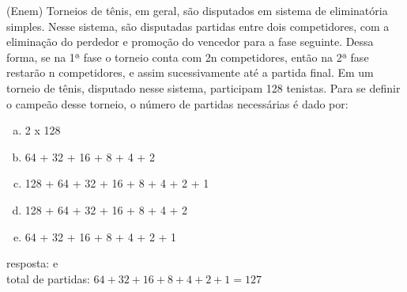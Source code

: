 \begin{ex} 
  (Enem) Torneios de tênis, em geral, são disputados em sistema de eliminatória simples. Nesse sistema, são disputadas partidas entre dois competidores, com a eliminação do perdedor e promoção do vencedor para a fase seguinte. Dessa forma, se na 1ª fase o torneio conta com 2n competidores, então na 2ª fase restarão n competidores, e assim sucessivamente até a partida final. Em um torneio de tênis, disputado nesse sistema, participam 128 tenistas. Para se definir o campeão desse torneio, o número de partidas necessárias é dado por:
    \begin{enumerate} [(a)]
        \item 2 x 128
        \item 64 + 32 + 16 + 8 + 4 + 2
        \item 128 + 64 + 32 + 16 + 8 + 4 + 2 + 1
        \item 128 + 64 + 32 + 16 + 8 + 4 + 2
        \item 64 + 32 + 16 + 8 + 4 + 2 + 1
    \end{enumerate}
      \begin{sol}
      resposta: e \\
      total de partidas: $64+32+16+8+4+2+1=127$
      \end{sol}  
 \end{ex}